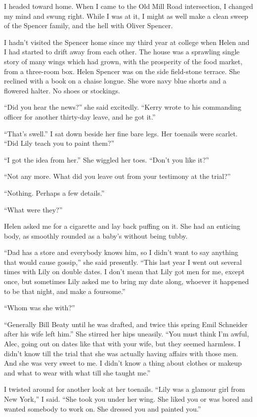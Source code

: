 \documentclass{novel}
\begin{document}
\scenestars

I headed toward home. When I came to the Old Mill Road intersection, I changed my mind and swung right. While I was at it, I might as well make a clean sweep of the Spencer family, and the hell with Oliver Spencer.

I hadn’t visited the Spencer home since my third year at college when Helen and I had started to drift away from each other. The house was a sprawling single story of many wings which had grown, with the prosperity of the food market, from a three-room box. Helen Spencer was on the side field-stone terrace. She reclined with a book on a chaise longue. She wore navy blue shorts and a flowered halter. No shoes or stockings.

“Did you hear the news?” she said excitedly. “Kerry wrote to his commanding officer for another thirty-day leave, and he got it.”

“That’s swell.” I sat down beside her fine bare legs. Her toenails were scarlet. “Did Lily teach you to paint them?”

“I got the idea from her.” She wiggled her toes. “Don’t you like it?”

“Not any more. What did you leave out from your testimony at the trial?”

“Nothing. Perhaps a few details.”

“What were they?”

Helen asked me for a cigarette and lay back puffing on it. She had an enticing body, as smoothly rounded as a baby’s without being tubby.

“Dad has a store and everybody knows him, so I didn’t want to say anything that would cause gossip,” she said presently. “This last year I went out several times with Lily on double dates. I don’t mean that Lily got men for me, except once, but sometimes Lily asked me to bring my date along, whoever it happened to be that night, and make a foursome.”

“Whom was she with?”

“Generally Bill Beaty until he was drafted, and twice this spring Emil Schneider after his wife left him.” She stirred her hips uneasily. “You must think I’m awful, Alec, going out on dates like that with your wife, but they seemed harmless. I didn’t know till the trial that she was actually having affairs with those men. And she was very sweet to me. I didn’t know a thing about clothes or makeup and what to wear with what till she taught me.”

I twisted around for another look at her toenails. “Lily was a glamour girl from New York,” I said. “She took you under her wing. She liked you or was bored and wanted somebody to work on. She dressed you and painted you.”
\end{document}
